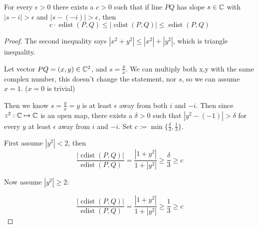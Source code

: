 \documentclass[a4paper]{article}
\begin{document}
\begin{lemma}[Technical]
    For every $\epsilon>0$ there exists a $c>0$ such that if line $PQ$ has slope $s\in \mathbb{C}$ with $|s-i|>\epsilon$ and $|s-(-i)|>\epsilon$, then
    $$c\cdot \operatorname{edist}(P,Q)\le |\operatorname{cdist}(P,Q)|\le \operatorname{edist}(P,Q)$$
\end{lemma}
\begin{proof}
    The second inequality says $|x^2+y^2|\le |x^2|+|y^2|$, which is triangle inequality.

    Let vector $PQ=(x,y)\in \mathbb{C}^2$, and $s=\frac{y}{x}$. We can multiply both x,y with the same complex number, this doesn't change the statement, nor $s$, so we can assume $x=1$. ($x=0$ is trivial)

    Then we know $s=\frac{y}{x}=y$ is at least $\epsilon$ away from both $i$ and $-i$. Then since $z^2:\mathbb{C} \mapsto \mathbb{C}$ is an open map, there exists a $\delta>0$ such that $|y^2-(-1)|>\delta$ for every $y$ at least $\epsilon$ away from $i$ and $-i$. Set $c:=\operatorname{min}\{\frac{\delta}{3},\frac{1}{3}\}$.

    First assume $|y^2|<2$, then
    $$\frac{|\operatorname{cdist}(P,Q)|}{\operatorname{edist}(P,Q)}=\frac{|1+y^2|}{1+|y^2|}\ge \frac{\delta}{3}\ge c$$

    Now assume $|y^2|\ge2$:

    $$\frac{|\operatorname{cdist}(P,Q)|}{\operatorname{edist}(P,Q)}=\frac{|1+y^2|}{1+|y^2|}\ge \frac{1}{3}\ge c$$

\end{proof}
\end{document}
